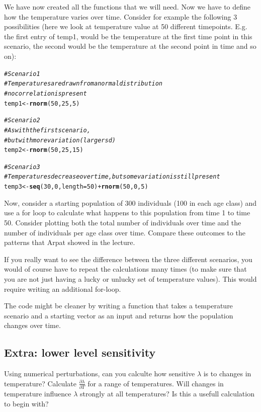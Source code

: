 \documentclass{article}\usepackage[]{graphicx}\usepackage[]{color}
\makeatletter
\newcommand{\hlnum}[1]{\textcolor[rgb]{0.686,0.059,0.569}{#1}}%
\newcommand{\hlcom}[1]{\textcolor[rgb]{0.678,0.584,0.686}{\textit{#1}}}%
\newcommand{\hlopt}[1]{\textcolor[rgb]{0,0,0}{#1}}%
\newcommand{\hlstd}[1]{\textcolor[rgb]{0.345,0.345,0.345}{#1}}%
\newcommand{\hlkwb}[1]{\textcolor[rgb]{0.69,0.353,0.396}{#1}}%
\newcommand{\hlkwc}[1]{\textcolor[rgb]{0.333,0.667,0.333}{#1}}%
\newcommand{\hlkwd}[1]{\textcolor[rgb]{0.737,0.353,0.396}{\textbf{#1}}}%
\newenvironment{kframe}{%
 \def\at@end@of@kframe{}%
 \ifinner\ifhmode%
  \def\at@end@of@kframe{\end{minipage}}%
  \begin{minipage}{\columnwidth}%
 \fi\fi%
 \def\FrameCommand##1{\hskip\@totalleftmargin \hskip-\fboxsep
 \colorbox{shadecolor}{##1}\hskip-\fboxsep
     \hskip-\linewidth \hskip-\@totalleftmargin \hskip\columnwidth}%
 \MakeFramed {\advance\hsize-\width
   \@totalleftmargin\z@ \linewidth\hsize
   \@setminipage}}%
 {\par\unskip\endMakeFramed%
 \at@end@of@kframe}
\newenvironment{knitrout}{}{} %
\makeatother
\begin{document}
We have now created all the functions that we will need. Now we have to define how the temperature varies over time. Consider for example the following 3 possibilities (here we look at temperature value at 50 different timepoints. E.g. the first entry of temp1, would be the temperature at the first time point in this scenario, the second would be the temperature at the second point in time and so on):
\begin{knitrout}
\color{fgcolor}\begin{kframe}
\begin{alltt}
\hlcom{# Scenario 1}
\hlcom{# Temperatures are drawn from a normal distribution}
\hlcom{# no correlation is present}
\hlstd{temp1} \hlkwb{<-} \hlkwd{rnorm}\hlstd{(}\hlnum{50}\hlstd{,}\hlnum{25}\hlstd{,}\hlnum{5}\hlstd{)}

\hlcom{# Scenario 2}
\hlcom{# As with the first scenario,}
\hlcom{# but with more variation (larger sd)}
\hlstd{temp2} \hlkwb{<-} \hlkwd{rnorm}\hlstd{(}\hlnum{50}\hlstd{,}\hlnum{25}\hlstd{,}\hlnum{15}\hlstd{)}

\hlcom{# Scenario 3}
\hlcom{# Temperatures decrease over time, but some variation is still present}
\hlstd{temp3} \hlkwb{<-} \hlkwd{seq}\hlstd{(}\hlnum{30}\hlstd{,}\hlnum{0}\hlstd{,}\hlkwc{length}\hlstd{=}\hlnum{50}\hlstd{)}\hlopt{+}\hlkwd{rnorm}\hlstd{(}\hlnum{50}\hlstd{,}\hlnum{0}\hlstd{,}\hlnum{5}\hlstd{)}
\end{alltt}
\end{kframe}
\end{knitrout}
Now, consider a starting population of 300 individuals (100 in each age class) and use a for loop to calculate what happens to this population from time 1 to time 50. Consider plotting both the total number of individuals over time and the number of individuals per age class over time. Compare these outcomes to the patterns that Arpat showed in the lecture.

If you really want to see the difference between the three different scenarios, you would of course have to repeat the calculations many times (to make sure that you are not just having a lucky or unlucky set of temperature values). This would require writing an additional for-loop. 

The code might be cleaner by writing a function that takes a temperature scenario and a starting vector as an input and returns how the population changes over time. 

\subsection{Extra: lower level sensitivity}
Using numerical perturbations, can you calculte how sensitive $\lambda$ is to changes in temperature? Calculate $\frac{\partial \lambda}{\partial T}$ for a range of temperatures. Will changes in temperature influence $\lambda$ strongly at all temperatures? Is this a usefull calculation to begin with?
\end{document}

